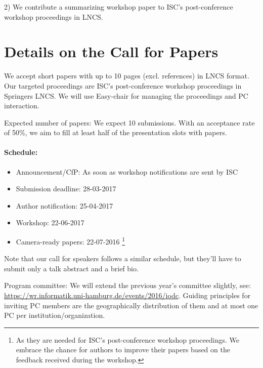\documentclass[a4paper,10pt]{article}
\begin{document}
2) We contribute a summarizing workshop paper to ISC's post-conference workshop proceedings in LNCS.

\section{Details on the Call for Papers}

We accept short papers with up to 10 pages (excl. references) in LNCS format.
Our targeted proceedings are ISC's post-conference workshop proceedings in Springers LNCS.
We will use Easy-chair for managing the proceedings and PC interaction.

Expected number of papers: We expect 10 submissions. With an acceptance rate of 50\%, we aim to fill at least half of the presentation slots with papers.

\paragraph{Schedule:}
\begin{itemize}
  \item Announcement/CfP: As soon as workshop notifications are sent by ISC
  \item Submission deadline: 28-03-2017
  \item Author notification: 25-04-2017
  \item Workshop: 22-06-2017
  \item Camera-ready papers: 22-07-2016 \footnote{As they are needed for ISC's post-conference workshop proceedings. We embrace the chance for authors to improve their papers based on the feedback received during the workshop.}
\end{itemize}
Note that our call for speakers follows a similar schedule, but they'll have to submit only a talk abstract and a brief bio.

Program committee:
We will extend the previous year's committee slightly, see: \url{https://wr.informatik.uni-hamburg.de/events/2016/iodc}.
Guiding principles for inviting PC members are the geographically distribution of them and at most one PC per institution/organization.
\end{document}
